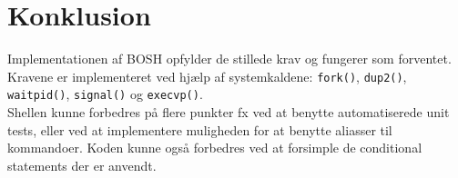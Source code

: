 \section{Konklusion}
Implementationen af BOSH opfylder de stillede krav og fungerer som forventet. Kravene er implementeret ved hjælp af systemkaldene: \verb+fork()+, \verb+dup2()+, \verb+waitpid()+, \verb+signal()+ og \verb+execvp()+.\\

Shellen kunne forbedres på flere punkter fx ved at benytte automatiserede unit tests, eller ved at implementere muligheden for at benytte aliasser til kommandoer. Koden kunne også forbedres ved at forsimple de conditional statements der er anvendt.